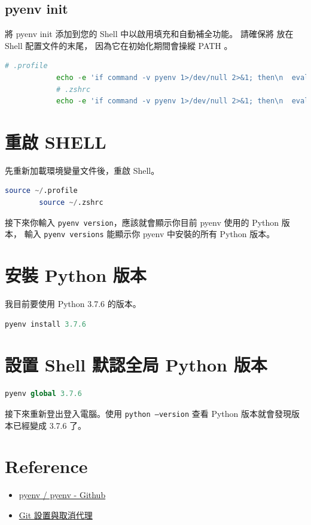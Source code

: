 \documentclass[12pt, a4paper]{article}
\begin{document}
    \subsection{pyenv init}
        將 pyenv init 添加到您的 Shell 中以啟用填充和自動補全功能。 
        請確保將 \texttt{} 放在 Shell 配置文件的末尾，
        因為它在初始化期間會操縱 PATH 。\\[0.01mm]

        \begin{lstlisting}[basicstyle=\tiny\Hack, language=Octave]
            # .profile
            echo -e 'if command -v pyenv 1>/dev/null 2>&1; then\n  eval "$(pyenv init -)"\nfi' >> ~/.profile
            # .zshrc
            echo -e 'if command -v pyenv 1>/dev/null 2>&1; then\n  eval "$(pyenv init -)"\nfi' >> ~/.zshrc
        \end{lstlisting}
\section{重啟 SHELL}
    先重新加載環境變量文件後，重啟 Shell。\\[0.01mm]

    \begin{lstlisting}[language=Octave]
        source ~/.profile
        source ~/.zshrc
    \end{lstlisting}

    接下來你輸入 \texttt{pyenv version}，應該就會顯示你目前 pyenv 使用的 Python 版本，
    輸入 \texttt{pyenv versions} 能顯示你 pyenv 中安裝的所有 Python 版本。
\section{安裝 Python 版本}
    我目前要使用 Python 3.7.6 的版本。\\[0.01mm]
    \begin{lstlisting}[language=Octave]
        pyenv install 3.7.6
    \end{lstlisting}
\section{設置 Shell 默認全局 Python 版本}
    \begin{lstlisting}[language=Octave]
        pyenv global 3.7.6
    \end{lstlisting}
    接下來重新登出登入電腦。使用 \texttt{python --version} 查看 Python 版本就會發現版本已經變成 3.7.6 了。
\section{Reference}
    \begin{itemize}
        \item \href{https://github.com/pyenv/pyenv}{pyenv / pyenv - Github}
        \item \href{https://gist.github.com/laispace/666dd7b27e9116faece6}{Git 設置與取消代理}
    \end{itemize}
\end{document}

